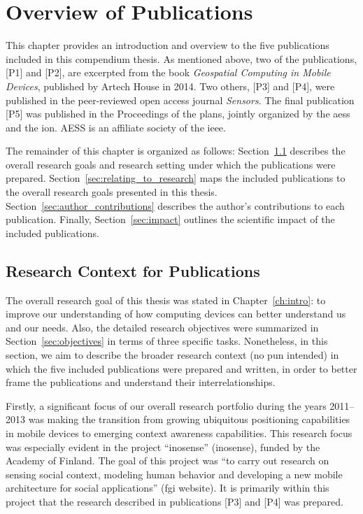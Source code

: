 \chapter{Overview of Publications}
\label{ch:overview_of_publications}

This chapter provides an introduction and overview to the five publications included in this compendium thesis. As mentioned above, two of the publications, [P1] and [P2], are excerpted from the book \emph{Geospatial Computing in Mobile Devices}, published by Artech House in 2014. Two others, [P3] and [P4], were published in the peer-reviewed open access journal \emph{Sensors}. The final publication [P5] was published in the Proceedings of the \gls{plans}, jointly organized by the \gls{aess} and the \gls{ion}. AESS is an affiliate society of the \gls{ieee}.

The remainder of this chapter is organized as follows: Section~\ref{sec:overall_research} describes the overall research goals and research setting under which the publications were prepared. Section~\ref{sec:relating_to_research} maps the included publications to the overall research goals presented in this thesis. Section~\ref{sec:author_contributions} describes the author's contributions to each publication. Finally, Section~\ref{sec:impact} outlines the scientific impact of the included publications.

\section{Research Context for Publications}
\label{sec:overall_research}

The overall research goal of this thesis was stated in Chapter~\ref{ch:intro}: to improve our understanding of how computing devices can better understand us and our needs. Also, the detailed research objectives were summarized in Section~\ref{sec:objectives} in terms of three specific tasks. Nonetheless, in this section, we aim to describe the broader research context (no pun intended) in which the five included publications were prepared and written, in order to better frame the publications and understand their interrelationships.

Firstly, a significant focus of our overall research portfolio during the years 2011--2013 was making the transition from growing ubiquitous positioning capabilities in mobile devices to emerging context awareness capabilities. This research focus was especially evident in the project ``\acrlong{inosense}'' (\acrshort{inosense}), funded by the Academy of Finland. The goal of this project was ``to carry out research on sensing social context, modeling human behavior and developing a new mobile architecture for social applications'' (\gls{fgi} website). It is primarily within this project that the research described in publications [P3] and [P4] was prepared.

